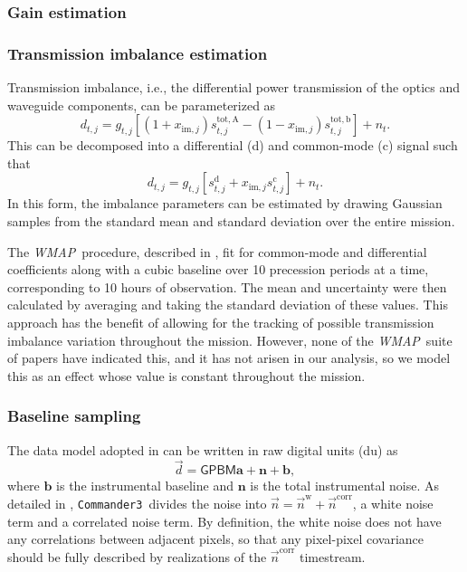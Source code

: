 \documentclass[twocolumn]{../../common/aa}
\def\WMAP{\emph{WMAP}}
\def\commanderthree{\texttt{Commander3}}
\renewcommand{\d}[0]{\vec{d}}
\newcommand{\n}[0]{\vec{n}}
\begin{document}
\subsubsection{Gain estimation}
\label{ssec:gain}



\subsubsection{Transmission imbalance estimation}
\label{ssec:imbalance}


Transmission imbalance, i.e., the differential power transmission of the optics and waveguide components, can be parameterized as
\begin{equation}
	d_{t,j}=g_{t,j}[(1+x_{\mathrm{im},j})s_{t,j}^\mathrm{tot,A}-(1-x_{\mathrm{im},j})s_{t,j}^\mathrm{tot,b}]+n_t.
\end{equation}
This can be decomposed into a differential (d) and common-mode (c) signal such that
\begin{equation}
	d_{t,j}=g_{t,j}[s_{t,j}^\mathrm d+x_{\mathrm{im},j}s_{t,j}^\mathrm c]+n_t.
\end{equation}
In this form, the imbalance parameters can be estimated by drawing Gaussian samples from the standard mean and standard deviation over the entire mission.

The \WMAP\ procedure, described in \citet{jarosik2003a}, fit for common-mode and differential coefficients along with a cubic baseline over 10 precession periods at a time, corresponding to 10 hours of observation. The mean and uncertainty were then calculated by averaging and taking the standard deviation of these values. This approach has the benefit of allowing for the tracking of possible transmission imbalance variation throughout the mission. However, none of the \WMAP\ suite of papers have indicated this, and it has not arisen in our analysis, so we model this as an effect whose value is constant throughout the mission.

\subsubsection{Baseline sampling}
\label{ssec:baseline}

The data model adopted in \citet{hinshaw2003a} can be written in raw digital units (du) as
\begin{equation}
	\d = \mathsf{GPBM}\boldsymbol a+\boldsymbol n+\boldsymbol b,
\end{equation}
where $\boldsymbol b$ is the instrumental baseline and $\boldsymbol n$ is the
total instrumental noise. As detailed in \citet{bp06}, \commanderthree\ divides
the noise into $\n=\n^\mathrm w+\n^\mathrm{corr}$, a white noise term and a
correlated noise term. By definition, the white noise does not have any
correlations between adjacent pixels, so that any pixel-pixel covariance should
be fully described by realizations of the $\n^\mathrm{corr}$ timestream.
\end{document}
